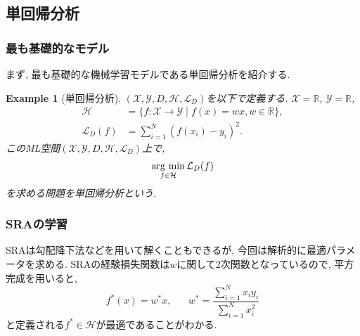 \documentclass[dvipdfmx,11pt]{beamer}		%
\newtheorem{exam}[defi]{Example}
\newcommand{\R}{\mathbb{R}}
\newcommand{\X}{\mathcal{X}}
\newcommand{\Y}{\mathcal{Y}}
\newcommand{\Hil}{\mathcal{H}}
\newcommand{\Loss}{\mathcal{L}_{D}}
\newcommand{\MLsp}{(\X, \Y, D, \Hil, \Loss)}
\newcommand{\argmin}{\mathop{\rm arg~min}\limits}
\begin{document}
    \subsection{単回帰分析}
    \begin{frame}\frametitle{最も基礎的なモデル}
        まず, 最も基礎的な機械学習モデルである単回帰分析を紹介する. 
        \begin{exam}[単回帰分析]
            $\MLsp$を以下で定義する. $\X = \R$, $\Y = \R$, 
            \begin{align*}
                \Hil &= \{f:\X\to\Y\mid f(x) = wx, w\in\R\},\\
                \Loss(f) &= \sum_{i = 1}^{N}(f(x_i) - y_i)^2.
            \end{align*}
            このML空間$\MLsp$上で,
            \begin{align*}
                \argmin_{f\in\Hil}\Loss(f)
            \end{align*}
            を求める問題を単回帰分析という.
        \end{exam}
    \end{frame}
    \begin{frame}
        \frametitle{SRAの学習}
        SRAは勾配降下法などを用いて解くこともできるが, 今回は解析的に最適パラメータを求める. 
        SRAの経験損失関数は$w$に関して2次関数となっているので, 平方完成を用いると, 
        \begin{equation*}
            f^{*}(x) = w^{*}x, \hspace{20pt} w^* = \frac{\sum_{i = 1}^{N}x_{i}y_{i}}{\sum_{i = 1}^{N}x_{i}^2}
        \end{equation*}
        と定義される$f^*\in\Hil$が最適であることがわかる. 
    \end{frame}
\end{document}
